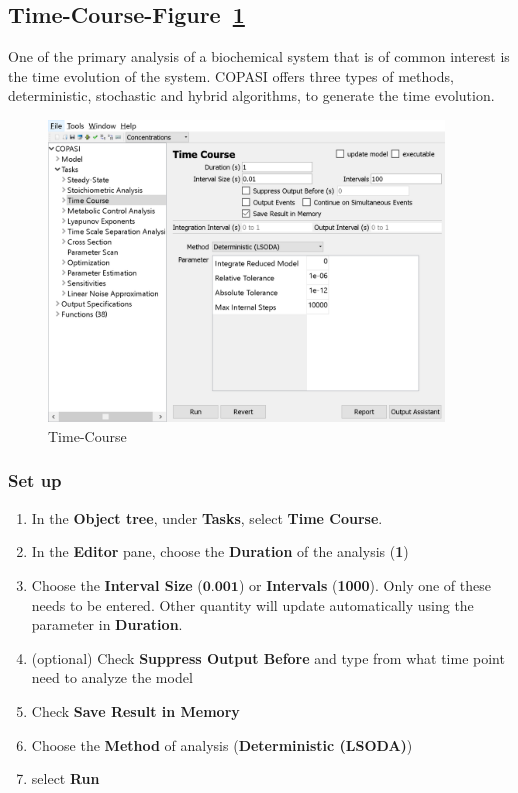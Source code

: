 \documentclass[10pt]{article}
\theoremstyle{definition}
\theoremstyle{remark}
\begin{document}
	\subsection{Time-Course-Figure~\ref{7png}}
    One of the primary analysis of a biochemical system that is of common interest is the time evolution of the system. COPASI offers three types of methods, deterministic, stochastic and hybrid algorithms, to generate the time evolution.
\begin{figure}[!htb]
		\centering
		\includegraphics[height=8cm]{Images/7a.png}
		\caption{Time-Course}
		\label{7png}
	\end{figure}
	\subsubsection*{Set up}
	\begin{enumerate}[start=1]\def\makelabel{\textbf{Step}~}
		\item In the \textbf{Object tree}, under \textbf{Tasks}, select \textbf{Time Course}.
		\item In the \textbf{Editor} pane, choose the \textbf{Duration} of the analysis (\textbf{1})
		\item Choose the \textbf{Interval Size} ($\textbf{0.001}$) or \textbf{Intervals} (\textbf{1000}). Only one of these needs to be entered. Other quantity will update automatically using the parameter in \textbf{Duration}.
		\item (optional) Check \textbf{Suppress Output Before} and type from what time point need to analyze the model
		\item Check \textbf{Save Result in Memory}
		\item Choose the \textbf{Method} of analysis (\textbf{Deterministic (LSODA)})
		\item select \textbf{Run}
	\end{enumerate}
\end{document}
